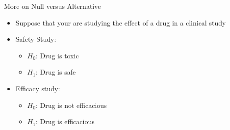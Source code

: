 \documentclass[xcolor=x11names,compress]{beamer}\usepackage[]{graphicx}\usepackage[]{color}
\begin{document}
\begin{frame}{More on Null versus Alternative}
  \begin{itemize}
  \item Suppose that your are studying the effect of a drug in a clinical study
  \item Safety Study:
    \begin{itemize}
    \item $H_0$: Drug is toxic
    \item $H_1$: Drug is safe
    \end{itemize}
  \item Efficacy study:
    \begin{itemize}
    \item $H_0$: Drug is not efficacious
    \item $H_1$: Drug is efficacious
    \end{itemize}
  \end{itemize}
  
\end{frame}
    
  
\end{document}
